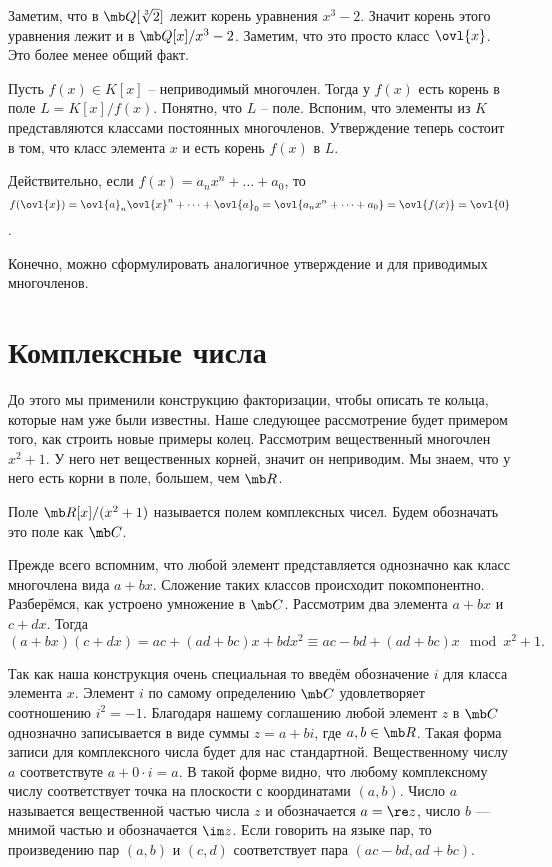 Заметим, что в $\mb Q[\sqrt[3]{2}]$ лежит корень уравнения $x^3-2$. Значит корень этого уравнения лежит и в $\mb Q[x]/x^3-2$. Заметим, что это просто класс $\ovl{x}$. Это более менее общий факт.



 Пусть $f(x)\in K[x]$ -- неприводимый многочлен. Тогда у $f(x)$ есть корень в поле $L=K[x]/f(x)$.
\eutv
\proof Понятно, что $L$ -- поле. Вспоним, что элементы из $K$ представляются классами постоянных многочленов. 
Утверждение теперь состоит в том, что класс элемента $x$ и есть корень $f(x)$ в $L$.

Действительно, если $f(x)=a_nx^n+\dots+a_0$, то $$f(\ovl{x})=\ovl{a}_n\ovl{x}^n+\dots+\ovl{a}_0=\ovl{a_nx^n+\dots+a_0}=\ovl{f(x)}=\ovl{0}$$.
\endproof

\rm Конечно, можно сформулировать аналогичное утверждение и для приводимых многочленов.
\erm





\section{Комплексные числа}

До этого мы применили конструкцию факторизации, чтобы описать те кольца, которые нам уже были известны. Наше следующее рассмотрение будет примером того, как строить новые примеры колец. Рассмотрим вещественный многочлен $x^2+1$. У него нет вещественных корней, значит он неприводим. Мы знаем, что у него есть корни в поле, большем, чем $\mb R$.

 Поле $\mb R[x]/(x^2 + 1)$ называется полем комплексных чисел. Будем обозначать это  поле как $\mb C$.
\edfn

Прежде всего вспомним, что любой элемент представляется однозначно как класс многочлена вида $a+bx$. Сложение таких классов происходит покомпонентно.
Разберёмся, как устроено умножение в $\mb C$.   Рассмотрим два элемента $a+bx$ и $c+dx$. Тогда
$$(a+bx)(c+dx)=ac+(ad+bc)x+bdx^2\equiv ac-bd + (ad+bc)x \mod x^2+1.$$

Так как наша конструкция очень специальная то введём обозначение $i$ для класса элемента $x$. Элемент $i$ по самому определению $\mb C$ удовлетворяет соотношению $i^2=-1$. Благодаря нашему соглашению любой элемент $z$ в $\mb C$ однозначно записывается в виде суммы $z=a+bi$, где $a,b\in \mb R$.  Такая форма записи для комплексного числа будет для нас стандартной. Вещественному числу $a$ соответствуте  $a+0\cdot i=a$. В такой форме видно, что любому комплексному числу соответствует точка на плоскости с координатами $(a,b)$. Число $a$ называется вещественной частью числа $z$ и обозначается $a=\re z$, число $b$ --- мнимой частью и обозначается $\im z$. Если говорить на языке пар, то произведению пар $(a,b)$ и $(c,d)$ соответствует пара $(ac-bd,ad+bc)$. 

